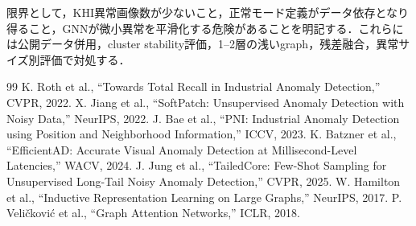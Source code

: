 \documentclass[a4paper,11pt]{ltjsarticle}
\begin{document}
限界として，KHI異常画像数が少ないこと，正常モード定義がデータ依存となり得ること，GNNが微小異常を平滑化する危険があることを明記する．これらには公開データ併用，cluster stability評価，1--2層の浅いgraph，残差融合，異常サイズ別評価で対処する．

\begin{thebibliography}{99}
 K. Roth et al., ``Towards Total Recall in Industrial Anomaly Detection,'' CVPR, 2022.
 X. Jiang et al., ``SoftPatch: Unsupervised Anomaly Detection with Noisy Data,'' NeurIPS, 2022.
 J. Bae et al., ``PNI: Industrial Anomaly Detection using Position and Neighborhood Information,'' ICCV, 2023.
 K. Batzner et al., ``EfficientAD: Accurate Visual Anomaly Detection at Millisecond-Level Latencies,'' WACV, 2024.
 J. Jung et al., ``TailedCore: Few-Shot Sampling for Unsupervised Long-Tail Noisy Anomaly Detection,'' CVPR, 2025.
 W. Hamilton et al., ``Inductive Representation Learning on Large Graphs,'' NeurIPS, 2017.
 P. Veli\v{c}kovi\'c et al., ``Graph Attention Networks,'' ICLR, 2018.
\end{thebibliography}
\end{document}
